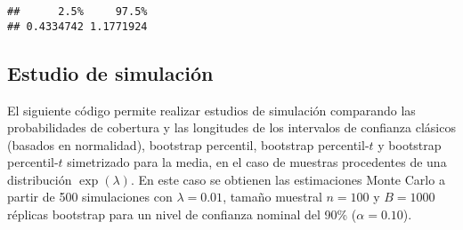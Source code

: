 \documentclass[]{book}
\theoremstyle{break}
\theoremstyle{definition}
\theoremstyle{definition}
\theoremstyle{definition}
\theoremstyle{remark}
\begin{document}
\begin{verbatim}
##      2.5%     97.5% 
## 0.4334742 1.1771924
\end{verbatim}

\subsection{Estudio de simulación}\label{estudio-sim-exp}

El siguiente código permite realizar estudios de simulación comparando
las probabilidades de cobertura y las longitudes de los intervalos de
confianza clásicos (basados en normalidad), bootstrap percentil,
bootstrap percentil-\(t\) y bootstrap percentil-\(t\) simetrizado para
la media, en el caso de muestras procedentes de una distribución
\(\exp \left( \lambda \right)\). En este caso se obtienen las
estimaciones Monte Carlo a partir de 500 simulaciones con
\(\lambda = 0.01\), tamaño muestral \(n=100\) y \(B=1000\) réplicas
bootstrap para un nivel de confianza nominal del 90\%
(\(\alpha =0.10\)).
\end{document}
